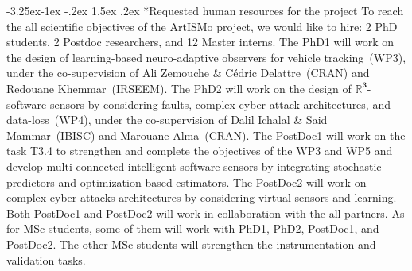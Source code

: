 \documentclass[a4paper,11pt]{article}
\makeatletter
\newcounter {subsubsubsection}[subsubsection]
\newcommand\subsubsubsection{\@startsection{subsubsubsection}{4}{\z@}%
                                     {-3.25ex\@plus -1ex \@minus -.2ex}%
                                     {1.5ex \@plus .2ex}%
                                     {\normalfont\normalsize\bfseries}}
\makeatother
\begin{document}
\vspace{-0.3cm}

\subsubsubsection*{Requested human resources for the project}
To reach the all scientific objectives of the ArtISMo project, we would like to hire: 2 PhD students, 2 Postdoc researchers, and 12 Master interns. The PhD1 will work on the design of learning-based neuro-adaptive observers for vehicle tracking~(WP3), under the co-supervision of Ali {\sc Zemouche} \& C\'edric  {\sc Delattre}~(CRAN) and Redouane {\sc Khemmar}~(IRSEEM). The PhD2 will work on the design of $\pmb{\mathbb{R}^{3}}$-software sensors by considering faults, complex cyber-attack architectures, and data-loss~(WP4), under the co-supervision of Dalil {\sc Ichalal} \& Said {\sc Mammar}~(IBISC) and {Marouane \sc Alma}~(CRAN). The PostDoc1 will work on the task T3.4 to strengthen and complete the objectives of the WP3 and WP5 and develop multi-connected intelligent software sensors by integrating stochastic predictors and optimization-based estimators. The PostDoc2 will work on complex cyber-attacks architectures by considering virtual sensors and learning. Both PostDoc1 and PostDoc2 will work in collaboration with the all partners. As for MSc students, some of them will work with PhD1, PhD2, PostDoc1, and PostDoc2. The other MSc students will strengthen the instrumentation and validation tasks.
\end{document}
